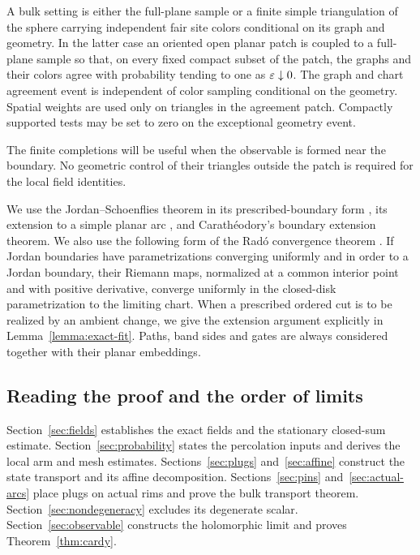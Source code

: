 \begin{definition}\label{def:bulk-setting}
A bulk setting is either the full-plane sample or a finite simple
triangulation of the sphere carrying independent fair site colors
conditional on its graph and geometry. In the latter case an oriented
open planar patch is coupled to a full-plane sample so that, on every
fixed compact subset of the patch, the graphs and their colors agree
with probability tending to one as $\varepsilon\downarrow0$. The graph and
chart agreement event is independent of color sampling conditional on
the geometry. Spatial weights are used only on triangles in the
agreement patch. Compactly supported tests may be set to zero on the
exceptional geometry event.
\end{definition}

The finite completions will be useful when the observable is formed
near the boundary. No geometric control of their triangles outside
the patch is required for the local field identities.

We use the Jordan--Schoenflies theorem in its prescribed-boundary form
\cite[Theorem~10.4]{Moise1977}, its extension to a simple planar arc
\cite[Premi\`ere Partie, Chapitre~I, Section~17]{Antoine1921},
and Carath\'eodory's boundary extension theorem. We also use
the following form of the Rad\'o convergence theorem
\cite[Section~1, pp.~182--183]{Rado1923}. If Jordan
boundaries have parametrizations converging uniformly and in order to
a Jordan boundary, their Riemann maps, normalized at a common interior
point and with positive derivative, converge uniformly in the
closed-disk parametrization to the limiting chart. When a prescribed
ordered cut is to be realized by an ambient change, we give the
extension argument explicitly in Lemma~\ref{lemma:exact-fit}.
Paths, band sides and gates are always considered together with their
planar embeddings.

\subsection{Reading the proof and the order of limits}

Section~\ref{sec:fields} establishes the exact fields and the stationary
closed-sum estimate. Section~\ref{sec:probability} states the percolation
inputs and derives the local arm and mesh estimates.
Sections~\ref{sec:plugs} and~\ref{sec:affine} construct the state
transport and its affine decomposition. Sections~\ref{sec:pins}
and~\ref{sec:actual-arcs} place plugs on actual rims and prove the bulk
transport theorem. Section~\ref{sec:nondegeneracy} excludes its
degenerate scalar. Section~\ref{sec:observable} constructs the
holomorphic limit and proves Theorem~\ref{thm:cardy}.

